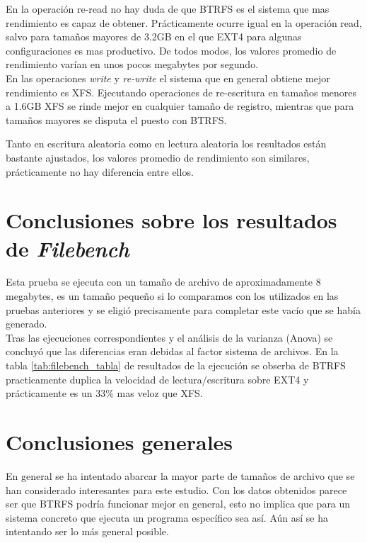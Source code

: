 En la operación re-read no hay duda de que BTRFS es el sistema que mas rendimiento es capaz de obtener. Prácticamente ocurre igual en la operación read, salvo para tamaños mayores de 3.2GB en el que EXT4 para algunas configuraciones es mas productivo. De todos modos, los valores promedio de rendimiento varían en unos pocos megabytes por segundo. \\

En las operaciones \textit{write} y \textit{re-write} el sistema que en general obtiene mejor rendimiento es XFS. Ejecutando operaciones de re-escritura en tamaños menores a 1.6GB XFS se rinde mejor en cualquier tamaño de registro, mientras que para tamaños mayores se disputa el puesto con BTRFS.

Tanto en escritura aleatoria como en lectura aleatoria los resultados están bastante ajustados, los valores promedio de rendimiento son similares, prácticamente no hay diferencia entre ellos.

\section{Conclusiones sobre los resultados de \textit{Filebench}}
Esta prueba se ejecuta con un tamaño de archivo de aproximadamente 8 megabytes, es un tamaño pequeño si lo comparamos con los utilizados en las pruebas anteriores y se eligió precisamente para completar este vacío que se había generado.\\

Tras las ejecuciones correspondientes y el análisis de la varianza (Anova) se concluyó que las diferencias eran debidas al factor sistema de archivos. En la tabla \ref{tab:filebench_tabla} de resultados de la ejecución se obserba  de BTRFS practicamente duplica la velocidad de lectura/escritura sobre EXT4 y prácticamente es un 33\% mas veloz que XFS. 

\section{Conclusiones generales}

En general se ha intentado abarcar la mayor parte de tamaños de archivo que se han considerado interesantes para este estudio. Con los datos obtenidos parece ser que BTRFS podría funcionar mejor en general, esto no implica que para un sistema concreto que ejecuta un programa específico sea así. Aún así se ha intentando ser lo más general posible.\\

